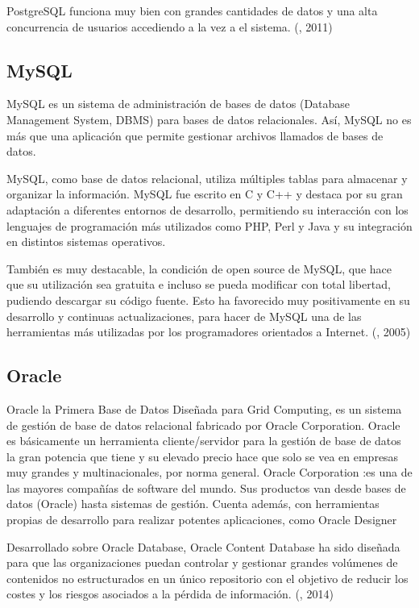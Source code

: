 PostgreSQL funciona muy bien con grandes cantidades de datos y una alta concurrencia de usuarios accediendo a la vez a el sistema. (\citet{postgresbib}, 2011)
\setlength{\parskip}{0mm}


\newpage
\subsection{MySQL}
\setlength{\parskip}{5mm}
MySQL es un sistema de administración de bases de datos (Database Management System, DBMS) para bases de datos relacionales. Así, MySQL no es más que una aplicación que permite gestionar archivos llamados de bases de datos.

MySQL, como base de datos relacional, utiliza múltiples tablas para almacenar y organizar la información. MySQL fue escrito en C y C++ y destaca por su gran adaptación a diferentes entornos de desarrollo, permitiendo su interacción con los lenguajes de programación más utilizados como PHP, Perl y Java y su integración en distintos sistemas operativos.

También es muy destacable, la condición de open source de MySQL, que hace que su utilización sea gratuita e incluso se pueda modificar con total libertad, pudiendo descargar su código fuente. Esto ha favorecido muy positivamente en su desarrollo y continuas actualizaciones, para hacer de MySQL una de las herramientas más utilizadas por los programadores orientados a Internet.
\setlength{\parskip}{0mm}
(\citet{mysqlbib}, 2005)

\subsection{Oracle}
\setlength{\parskip}{5mm}
Oracle la Primera Base de Datos Diseñada para Grid Computing, es un sistema de gestión de base de datos relacional fabricado por Oracle Corporation. Oracle es básicamente un herramienta cliente/servidor para la gestión de base de datos la gran potencia que tiene y su elevado precio hace que solo se vea en empresas muy grandes y multinacionales, por norma general. Oracle Corporation :es una de las mayores compañías de software del mundo. Sus productos van desde bases de datos (Oracle) hasta sistemas de gestión. Cuenta además, con herramientas propias de desarrollo para realizar potentes aplicaciones, como Oracle Designer

Desarrollado sobre Oracle Database, Oracle Content Database ha sido diseñada para que las organizaciones puedan controlar y gestionar grandes volúmenes de contenidos no estructurados en un único repositorio con el objetivo de reducir los costes y los riesgos asociados a la pérdida de información.
\setlength{\parskip}{0mm}
(\citet{oraclebib}, 2014) 


